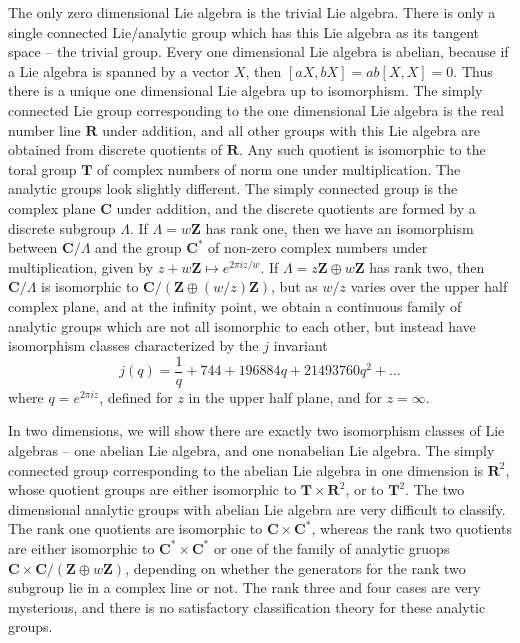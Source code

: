 The only zero dimensional Lie algebra is the trivial Lie algebra. There is only a single connected Lie/analytic group which has this Lie algebra as its tangent space -- the trivial group. Every one dimensional Lie algebra is abelian, because if a Lie algebra is spanned by a vector $X$, then $[aX, bX] = ab[X,X] = 0$. Thus there is a unique one dimensional Lie algebra up to isomorphism. The simply connected Lie group corresponding to the one dimensional Lie algebra is the real number line $\mathbf{R}$ under addition, and all other groups with this Lie algebra are obtained from discrete quotients of $\mathbf{R}$. Any such quotient is isomorphic to the toral group $\mathbf{T}$ of complex numbers of norm one under multiplication. The analytic groups look slightly different. The simply connected group is the complex plane $\mathbf{C}$ under addition, and the discrete quotients are formed by a discrete subgroup $\Lambda$. If $\Lambda = w\mathbf{Z}$ has rank one, then we have an isomorphism between $\mathbf{C}/\Lambda$ and the group $\mathbf{C}^*$ of non-zero complex numbers under multiplication, given by $z + w\mathbf{Z} \mapsto e^{2 \pi i z/w}$. If $\Lambda = z\mathbf{Z} \oplus w\mathbf{Z}$ has rank two, then $\mathbf{C}/\Lambda$ is isomorphic to $\mathbf{C}/(\mathbf{Z} \oplus (w/z) \mathbf{Z})$, but as $w/z$ varies over the upper half complex plane, and at the infinity point, we obtain a continuous family of analytic groups which are not all isomorphic to each other, but instead have isomorphism classes characterized by the $j$ invariant
%
\[ j(q) = \frac{1}{q} + 744 + 196884q + 21493760q^2 + \dots \]
%
where $q = e^{2 \pi i z}$, defined for $z$ in the upper half plane, and for $z = \infty$.

In two dimensions, we will show there are exactly two isomorphism classes of Lie algebras -- one abelian Lie algebra, and one nonabelian Lie algebra. The simply connected group corresponding to the abelian Lie algebra in one dimension is $\mathbf{R}^2$, whose quotient groups are either isomorphic to $\mathbf{T} \times \mathbf{R}^2$, or to $\mathbf{T}^2$. The two dimensional analytic groups with abelian Lie algebra are very difficult to classify. The rank one quotients are isomorphic to $\mathbf{C} \times \mathbf{C}^*$, whereas the rank two quotients are either isomorphic to $\mathbf{C}^* \times \mathbf{C}^*$ or one of the family of analytic gruops $\mathbf{C} \times \mathbf{C}/(\mathbf{Z} \oplus w\mathbf{Z})$, depending on whether the generators for the rank two subgroup lie in a complex line or not. The rank three and four cases are very mysterious, and there is no satisfactory classification theory for these analytic groups.


